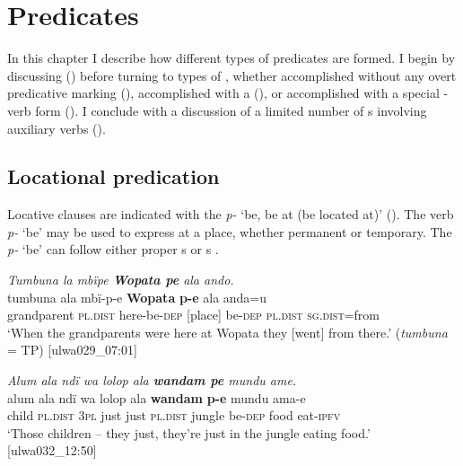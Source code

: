 \chapter{Predicates}\label{sec:10}


In this chapter I describe how different types of predicates are formed. I begin by discussing  () before turning to types of , whether accomplished without any overt predicative marking (), accomplished with a  (), or accomplished with a special - verb form (). I conclude with a discussion of a limited number of s involving auxiliary verbs ().


\section{Locational predication}\label{sec:10.1}


Locative clauses are indicated with the  \textit{p-} ‘be, be at (be located at)’ (). The verb \textit{p-} ‘be’ may be used to express  at a place, whether permanent or temporary. The  \textit{p-} ‘be’ can follow either proper s  or  s .

\ea%
    \label{ex:pred:1}
            \textit{Tumbuna la mbïpe \textbf{Wopata pe} ala ando.}\\
\gll    tumbuna    ala       mbï-p-e    \textbf{Wopata}  \textbf{p-e} ala      anda=u\\
    grandparent  \textsc{pl.dist}  here-be-\textsc{dep}  [place]    be-\textsc{dep}    \textsc{pl.dist}  \textsc{sg.dist}=from\\
\glt `When the grandparents were here at Wopata they [went] from there.’ (\textit{tumbuna} = TP) [ulwa029\_07:01]
\z

\ea%
    \label{ex:pred:2}
            \textit{Alum ala ndï wa lolop ala \textbf{wandam pe} mundu ame.}\\
\gll    alum  ala      ndï  wa   lolop  ala      \textbf{wandam}  \textbf{p-e} mundu  ama-e\\
    child  \textsc{pl.dist}  3\textsc{pl}  just  just    \textsc{pl.dist}  jungle    be-\textsc{dep}    food  eat-\textsc{ipfv}\\
\glt `Those children -- they just, they’re just in the jungle eating food.’ [ulwa032\_12:50]
\z

